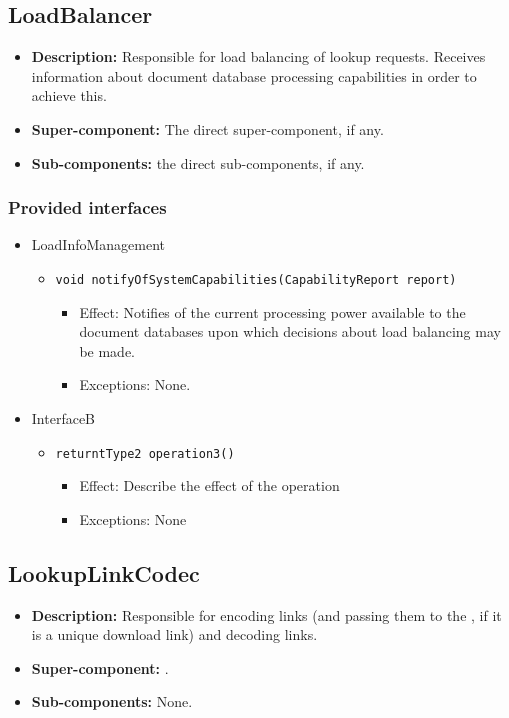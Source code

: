 \subsection{LoadBalancer}
\begin{itemize}
    \item \textbf{Description:} Responsible for load balancing of lookup requests. Receives information about document database processing capabilities in order to achieve this.
    \item \textbf{Super-component:} The direct super-component, if any.
    \item \textbf{Sub-components:} the direct sub-components, if any.
\end{itemize}

\subsubsection*{Provided interfaces}
\begin{itemize}
    \item LoadInfoManagement
    \begin{itemize}
        \item \texttt{void notifyOfSystemCapabilities(CapabilityReport report)}
        \begin{itemize}
            \item Effect: Notifies of the current processing power available to the document databases upon which decisions about load balancing may be made.
            \item Exceptions: None.
        \end{itemize}
    \end{itemize}

    \item InterfaceB
    \begin{itemize}
        \item \texttt{returntType2 operation3()}
        \begin{itemize}
            \item Effect: Describe the effect of the operation
            \item Exceptions: None
        \end{itemize}
    \end{itemize}
\end{itemize}

\subsection{LookupLinkCodec}
\begin{itemize}
    \item \textbf{Description:} Responsible for encoding links (and passing them to the , if it is a unique download link) and decoding links.
    \item \textbf{Super-component:} .
    \item \textbf{Sub-components:} None.
\end{itemize}

